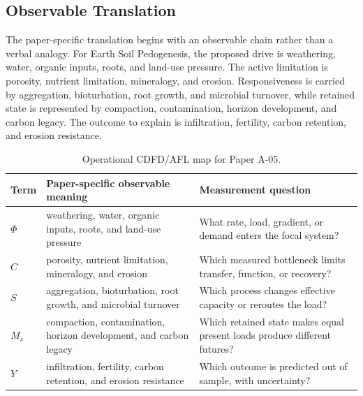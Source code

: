 \documentclass[11pt,a4paper]{article}
\begin{document}
\subsection{Observable Translation}

The paper-specific translation begins with an observable chain rather than a
verbal analogy. For Earth Soil Pedogenesis, the proposed drive is weathering, water, organic inputs, roots, and land-use pressure.
The active limitation is porosity, nutrient limitation, mineralogy, and erosion. Responsiveness is carried by
aggregation, bioturbation, root growth, and microbial turnover, while retained state is represented by
compaction, contamination, horizon development, and carbon legacy. The outcome to explain is infiltration, fertility, carbon retention, and erosion resistance.

\begin{table}[htbp]
\centering
\small
\caption{Operational CDFD/AFL map for Paper A-05.}
\begin{tabularx}{\textwidth}{|l|X|X|}
\hline
\textbf{Term} & \textbf{Paper-specific observable meaning} & \textbf{Measurement question} \\
\hline
$\Phi$ & weathering, water, organic inputs, roots, and land-use pressure & What rate, load, gradient, or demand enters the focal system? \\
\hline
$C$ & porosity, nutrient limitation, mineralogy, and erosion & Which measured bottleneck limits transfer, function, or recovery? \\
\hline
$S$ & aggregation, bioturbation, root growth, and microbial turnover & Which process changes effective capacity or reroutes the load? \\
\hline
$M_s$ & compaction, contamination, horizon development, and carbon legacy & Which retained state makes equal present loads produce different futures? \\
\hline
$Y$ & infiltration, fertility, carbon retention, and erosion resistance & Which outcome is predicted out of sample, with uncertainty? \\
\hline
\end{tabularx}
\end{table}
\end{document}
